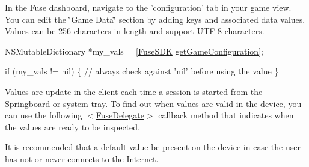 In the Fuse dashboard, navigate to the 'configuration' tab in your game view. You can edit the \char`\"{}\+Game Data\char`\"{} section by adding keys and associated data values. Values can be 256 characters in length and support U\+T\+F-\/8 characters.


\begin{DoxyCode}
NSMutableDictionary *my\_vals = [\hyperlink{interface_fuse_s_d_k}{FuseSDK} \hyperlink{interface_fuse_s_d_k_a0267e0bb12395c93cea9442f62dcc53e}{getGameConfiguration}];

\textcolor{keywordflow}{if} (my\_vals != nil)
\{
   \textcolor{comment}{// always check against 'nil' before using the value}
\}
\end{DoxyCode}


Values are update in the client each time a session is started from the Springboard or system tray. To find out when values are valid in the device, you can use the following $<$\hyperlink{protocol_fuse_delegate-p}{Fuse\+Delegate}$>$ callback method that indicates when the values are ready to be inspected.




It is recommended that a default value be present on the device in case the user has not or never connects to the Internet.


